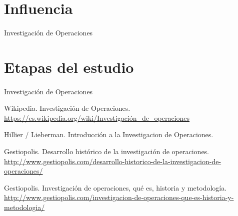 \documentclass[10pt, a4paper,spanish]{article}
\begin{document}
	\section{Influencia}
		\paragraph{}
		Investigación de Operaciones
			
	\section{Etapas del estudio}
		\paragraph{}
		Investigación de Operaciones
					

	\begin{thebibliography}{9}
	
		Wikipedia. Investigación de Operaciones. \url{https://es.wikipedia.org/wiki/Investigación_de_operaciones}
		
		Hillier / Lieberman. Introducción a la Investigacion de Operaciones.
		
		Gestiopolis. Desarrollo histórico de la investigación de operaciones. \url{http://www.gestiopolis.com/desarrollo-historico-de-la-investigacion-de-operaciones/}

		Gestiopolis. Investigación de operaciones, qué es, historia y metodología. \url{http://www.gestiopolis.com/investigacion-de-operaciones-que-es-historia-y-metodologia/}

		
	\end{thebibliography}
\end{document}
